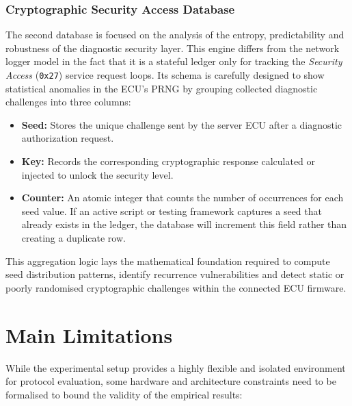 \subsubsection*{Cryptographic Security Access Database}
The second database is focused on the analysis of the entropy, predictability and robustness of the diagnostic security layer. This engine differs from the network logger model in the fact that it is a stateful ledger only for tracking the \textit{Security Access} (\texttt{0x27}) service request loops. Its schema is carefully designed to show statistical anomalies in the \gls{ECU}'s \gls{PRNG} by grouping collected diagnostic challenges into three columns:
\begin{itemize}
    \item \textbf{Seed:} Stores the unique challenge sent by the server ECU after a diagnostic authorization request.
    \item \textbf{Key:} Records the corresponding cryptographic response calculated or injected to unlock the security level.
    \item \textbf{Counter:} An atomic integer that counts the number of occurrences for each seed value. If an active script or testing framework captures a seed that already exists in the ledger, the database will increment this field rather than creating a duplicate row.
\end{itemize}
This aggregation logic lays the mathematical foundation required to compute seed distribution patterns, identify recurrence vulnerabilities and detect static or poorly randomised cryptographic challenges within the connected \gls{ECU} firmware.
\section{Main Limitations}
\label{sec:main_limitations}

While the experimental setup provides a highly flexible and isolated environment for protocol evaluation, some hardware and architecture constraints need to be formalised to bound the validity of the empirical results:

